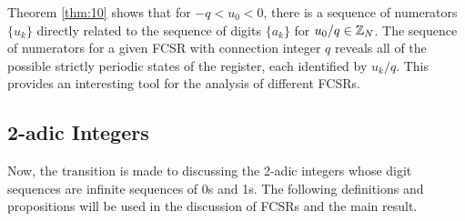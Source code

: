 
\par Theorem \ref{thm:10} shows that for $-q<u_0<0$, there is a sequence of
numerators $\{u_k\}$ directly related to the sequence of digits $\{a_k\}$
for $u_0/q\in\mathbb{Z}_N$. The sequence of numerators for a given FCSR with connection
integer $q$ reveals all of the possible strictly periodic states of the
register, each identified by $u_k/q$. This provides an interesting tool for the
analysis of different FCSRs.


\subsection{2-adic Integers}
\par Now, the transition is made to discussing the 2-adic integers whose digit
sequences are infinite sequences of 0s and 1s. The following definitions and
propositions will be used in the discussion of FCSRs and the main result.

